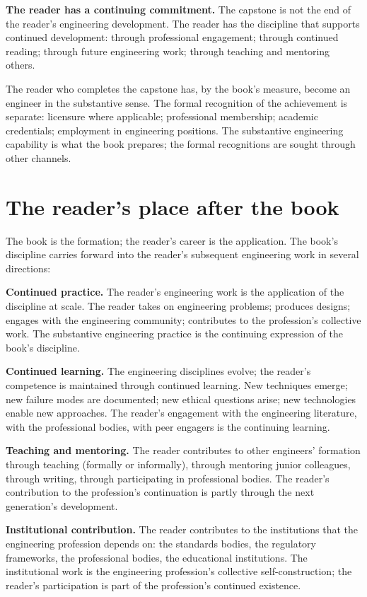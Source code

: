 \textbf{The reader has a continuing commitment.} The capstone is not the end of the reader's engineering development. The reader has the discipline that supports continued development: through professional engagement; through continued reading; through future engineering work; through teaching and mentoring others.

The reader who completes the capstone has, by the book's measure, become an engineer in the substantive sense. The formal recognition of the achievement is separate: licensure where applicable; professional membership; academic credentials; employment in engineering positions. The substantive engineering capability is what the book prepares; the formal recognitions are sought through other channels.

\section{The reader's place after the book}

The book is the formation; the reader's career is the application. The book's discipline carries forward into the reader's subsequent engineering work in several directions:

\textbf{Continued practice.} The reader's engineering work is the application of the discipline at scale. The reader takes on engineering problems; produces designs; engages with the engineering community; contributes to the profession's collective work. The substantive engineering practice is the continuing expression of the book's discipline.

\textbf{Continued learning.} The engineering disciplines evolve; the reader's competence is maintained through continued learning. New techniques emerge; new failure modes are documented; new ethical questions arise; new technologies enable new approaches. The reader's engagement with the engineering literature, with the professional bodies, with peer engagers is the continuing learning.

\textbf{Teaching and mentoring.} The reader contributes to other engineers' formation through teaching (formally or informally), through mentoring junior colleagues, through writing, through participating in professional bodies. The reader's contribution to the profession's continuation is partly through the next generation's development.

\textbf{Institutional contribution.} The reader contributes to the institutions that the engineering profession depends on: the standards bodies, the regulatory frameworks, the professional bodies, the educational institutions. The institutional work is the engineering profession's collective self-construction; the reader's participation is part of the profession's continued existence.

